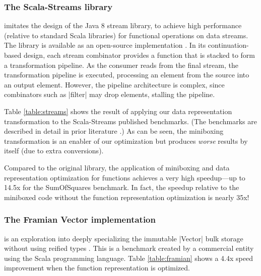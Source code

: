 \subsubsection{The Scala-Streams library} \cite{biboudis_clash_2014} imitates the design of the Java 8 stream library, to achieve high performance (relative to standard Scala libraries) for functional operations on data streams. The library is available as an open-source implementation \cite{biboudis-streams}. In its continuation-based design, each stream combinator provides a function that is stacked to form a transformation pipeline. As the consumer reads from the final stream, the transformation pipeline is executed, processing an element from the source into an output element. However, the pipeline architecture is complex, since combinators such as |filter| may drop elements, stalling the pipeline.

Table \ref{table:streams} shows the result of applying our data
representation transformation to the Scala-Streams published
benchmarks. (The benchmarks are described in detail in prior
literature \cite{biboudis_clash_2014}.) As can be seen, the miniboxing
transformation is an enabler of our optimization but produces
\emph{worse} results by itself (due to extra conversions).

Compared to the original library, the application of miniboxing and
data representation optimization for functions achieves a very high
speedup---up to 14.5x for the SumOfSquares benchmark. In fact, the
speedup relative to the miniboxed code without the function
representation optimization is nearly 35x!



\subsubsection{The Framian Vector implementation} is an exploration into deeply specializing the immutable |Vector| bulk storage without using reified types \cite{tixxit-respecialization15,tixxit-respecialization6}. This is a benchmark created by a commercial entity using the Scala programming language. Table \ref{table:framian} shows a 4.4x speed improvement when the function representation is optimized.

